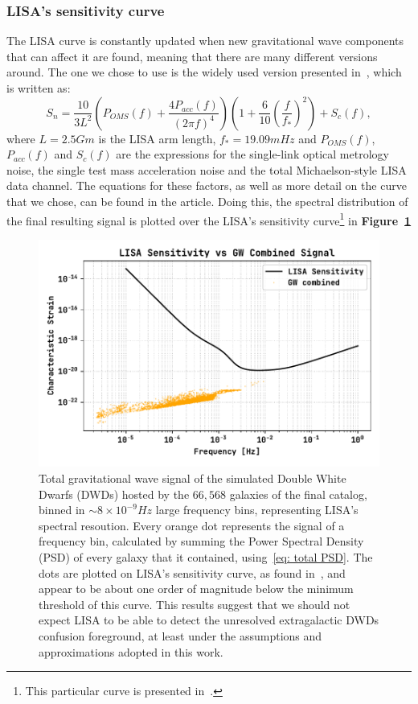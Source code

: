 \subsubsection{LISA's sensitivity curve}
The LISA curve is constantly updated when new gravitational wave components that can affect it are found, meaning that there are many different versions around.
The one we chose to use is the widely used version presented in~\cite{Robson_2019}, which is written as:
\begin{equation}
    S_n = \frac{10}{3L^2} \left( P_{OMS}(f) + \frac{4P_{acc}(f)}{(2\pi f)^4} \right)\left( 1 + \frac{6}{10}\left(\frac{f}{f_*}\right)^2 \right) + S_c(f),
    \label{eq: LISA sensitivity curve by Robson}
\end{equation}
where $L=2.5 Gm$ is the LISA arm length, $f_*=19.09mHz$ and $P_{OMS}(f)$, $P_{acc}(f)$ and $S_c(f)$ are the expressions for the single-link optical metrology noise, the single test mass acceleration noise and the total Michaelson-style LISA data channel. 
The equations for these factors, as well as more detail on the curve that we chose, can be found in the article.
Doing this, the spectral distribution of the final resulting signal is plotted over the LISA's sensitivity curve\footnote{This particular curve is presented in~\cite{Robson_2019}.} in \textbf{Figure~\ref{fig: Final results plot}}
\begin{figure}[hb!]
    \begin{center}
        \includegraphics[width=\textwidth]{images/Final_results_plot.pdf}
    \end{center}
    \caption{Total gravitational wave signal of the simulated Double White Dwarfs (DWDs) hosted by the $66,568$ galaxies of the final catalog, binned in $\sim 8\times10^{-9}Hz$ large frequency bins, representing LISA's spectral resoution. 
    Every orange dot represents the signal of a frequency bin, calculated by summing the Power Spectral Density (PSD) of every galaxy that it contained, using~\eqref{eq: total PSD}. 
    The dots are plotted on LISA's sensitivity curve, as found in~\cite{Robson_2019}, and appear to be about one order of magnitude below the minimum threshold of this curve.
    This results suggest that we should not expect LISA to be able to detect the unresolved extragalactic DWDs confusion foreground, at least under the assumptions and approximations adopted in this work.}\label{fig: Final results plot}
\end{figure}
